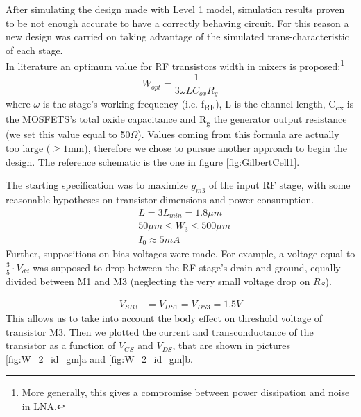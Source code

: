 After simulating the design made with Level 1 model, simulation results proven to be not enough accurate to have a correctly behaving circuit.
For this reason a new design was carried on taking advantage of the simulated trans-characteristic of each stage.\\
In literature an optimum value for RF transistors width in mixers is proposed:\footnote{More generally, this gives a compromise between power dissipation and noise in LNA.}
\begin{equation}
W_{opt}=\frac{1}{3\omega L C_{ox} R_{g}}
\end{equation}
where $\omega$ is the stage's working frequency (i.e. f\textsubscript{RF}), L is the channel length, C\textsubscript{ox} is the MOSFETS's total oxide capacitance and R\textsubscript{g} the generator output resistance (we set this value equal to 50$\Omega$). Values coming from this formula are actually too large ($\ge1$mm), therefore we chose to pursue another approach to begin the design.
The reference schematic is the one in figure \ref{fig:GilbertCell1}.

The starting specification was to maximize \(g_{m3}\) of the input RF stage, with some reasonable hypotheses on transistor dimensions and power consumption. 
\begin{align}
	&L=3 L_{min} = 1.8\mu m \nonumber\\
	&50 \mu m \le W_3 \le 500 \mu m \nonumber \\
	&I_0 \approx 5mA \nonumber 
\end{align}
Further, suppositions on bias voltages were made. For example, a voltage equal to \(\frac{3}{5}\cdot V_{dd}\) was supposed to drop between the RF stage's drain and ground, equally divided between M1 and M3 (neglecting the very small voltage drop on \(R_S\)). 

\begin{align}
	V_{SB3} &= V_{DS1} = V_{DS3} = 1.5 V \nonumber 
\end{align}
This allows us to take into account the body effect on threshold voltage of transistor M3.
Then we plotted the current and transconductance of the transistor as a function of \(V_{GS}\) and \(V_{DS}\), that are shown in pictures \ref{fig:W_2_id_gm}a and \ref{fig:W_2_id_gm}b.

